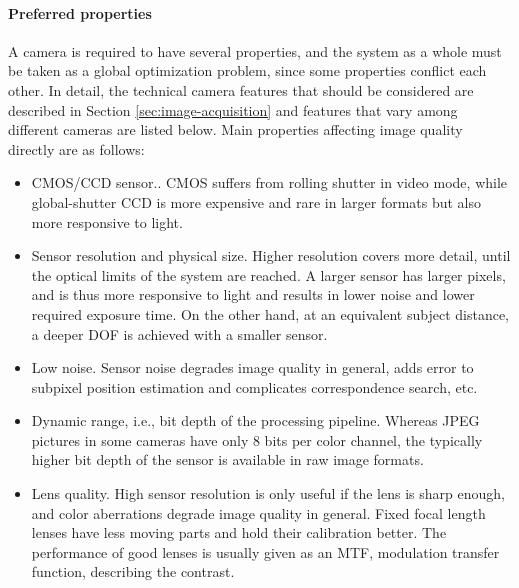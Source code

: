 \paragraph{Preferred properties}
A camera is required to have several properties, and the system as a whole must be taken as a global optimization problem, since some properties conflict each other.
In detail, the technical camera features that should be considered are described in Section \ref{sec:image-acquisition} and features that vary among different cameras are listed below.
Main properties affecting image quality directly are as follows:

\begin{itemize}
	\item CMOS/CCD sensor..
		CMOS suffers from rolling shutter in video mode, while global-shutter CCD is more expensive and rare in larger formats but also more responsive to light.

	\item Sensor resolution and physical size.
		Higher resolution covers more detail, until the optical limits of the system are reached.
		A larger sensor has larger pixels, and is thus more responsive to light and results in lower noise and lower required exposure time.
		On the other hand, at an equivalent subject distance, a deeper DOF is achieved with a smaller sensor.

	\item Low noise.
		Sensor noise degrades image quality in general, adds error to subpixel position estimation and complicates correspondence search, etc.

	\item Dynamic range, i.e., bit depth of the processing pipeline.
		Whereas JPEG pictures in some cameras have only 8 bits per color channel, the typically higher bit depth of the sensor is available in raw image formats.  %

	\item Lens quality.
		High sensor resolution is only useful if the lens is sharp enough, and color aberrations degrade image quality in general.
		Fixed focal length lenses have less moving parts and hold their calibration better.
		The performance of good lenses is usually given as an MTF, modulation transfer function, describing the contrast.
\end{itemize}

